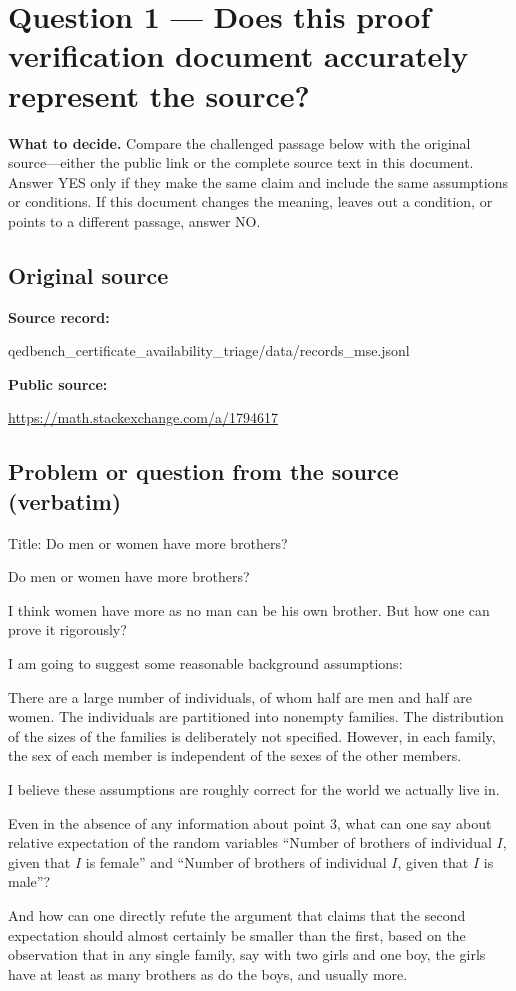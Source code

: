 \documentclass[11pt]{article}
\begin{document}
\section*{Question 1 --- Does this proof verification document accurately represent the source?}
\textbf{What to decide.} Compare the challenged passage below with the original source---either the public link or the complete source text in this document. Answer YES only if they make the same claim and include the same assumptions or conditions. If this document changes the meaning, leaves out a condition, or points to a different passage, answer NO.
\subsection*{Original source}
\textbf{Source record:}
\begin{Vsrc}
qedbench_certificate_availability_triage/data/records_mse.jsonl
\end{Vsrc}
\textbf{Public source:}\par
\url{https://math.stackexchange.com/a/1794617}\par
\subsection*{Problem or question from the source (verbatim)}
\begin{Vsrc}
Title: Do men or women have more brothers?

Do men or women have more brothers?

I think women have more as no man can be his own brother. But how one can prove it rigorously?

I am going to suggest some reasonable background assumptions:

There are a large number of individuals, of whom half are men and half are women.
The individuals are partitioned into nonempty families.
The distribution of the sizes of the families is deliberately not specified.
However, in each family, the sex of each member is independent of the sexes of the other members.

I believe these assumptions are roughly correct for the world we actually live in.

Even in the absence of any information about point 3, what can one say about relative expectation of the random variables “Number of brothers of individual $I$, given that $I$ is female” and “Number of brothers of individual $I$, given that $I$ is male”?

And how can one directly refute the argument that claims that the second expectation should almost certainly be smaller than the first, based on the observation that in any single family, say with two girls and one boy, the girls have at least as many brothers as do the boys, and usually more.
\end{Vsrc}
\end{document}
